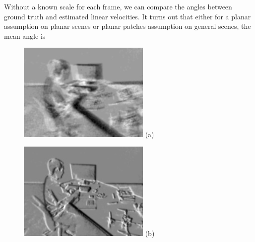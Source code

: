   Without a known scale for each frame, we can compare the angles
  between ground truth and estimated linear velocities. It turns out
  that either for a planar assumption on planar scenes or planar patches
  assumption on general scenes, the mean angle is
  \begin{figure}[H]
    \begin{minipage}[t]{0.48\textwidth}
      \centering \includegraphics[width =
      \textwidth]{images/zero_motion_934.jpg} (a)
    \end{minipage}
    \hfill
    \begin{minipage}[t]{0.48\textwidth}
      \centering \includegraphics[width =
      \textwidth]{images/optimized_934.jpg} (b)
    \end{minipage}

\end{figure}
